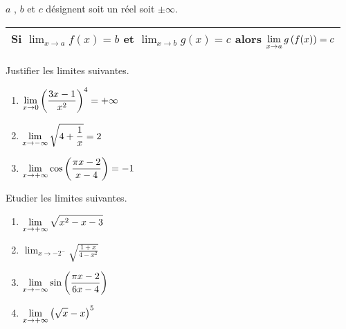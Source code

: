 
\everymath{\displaystyle}


  \summary{}


$a $ , $b $ \; et \; $ c $ désignent soit un réel soit $ \pm\infty $.

\medskip
\begin{tabularx}{\textwidth}{|X|}
\hline
Si  $ \displaystyle\lim_{x \to a}f(x)=b $\; et \;  $ \displaystyle\lim_{x \to b}g(x)=c $\; alors \;  $ \displaystyle\lim_{x \to a}g\left(f(x)\right)=c $\\
\hline
\end{tabularx}
 \medskip
 
\begin{exercice}
  Justifier  les limites suivantes.
\begin{enumerate}
\item  $\displaystyle \lim_{x \to 0}\left(\frac{3x-1}{x^2}\right)^{4}=+\infty$
\item   $\displaystyle\lim_{x \to -\infty}  \sqrt{4+\frac{1}{x}}=2$ 
 \item  $\displaystyle\lim_{x \to +\infty}\cos\left(\frac{\pi x-2}{x-4}\right) =-1$
 \end{enumerate}
\end{exercice}
\bigskip


\begin{exercice}
Etudier   les limites suivantes.
\medskip

\begin{enumerate}
\item $\displaystyle \lim_{x \to +\infty}\sqrt{x^2-x-3}$
\item   $\displaystyle\lim_{x \to -2^{-}}  \sqrt{\frac{1+x}{4-x^2}}$  
\item    $\displaystyle\lim_{x \to -\infty}\sin\left(\frac{\pi x-2}{6x-4}\right)$
\item   $\displaystyle\lim_{x \to +\infty}\left(\sqrt{x}-x\right)^5$
\end{enumerate}
\end{exercice}
\bigskip



